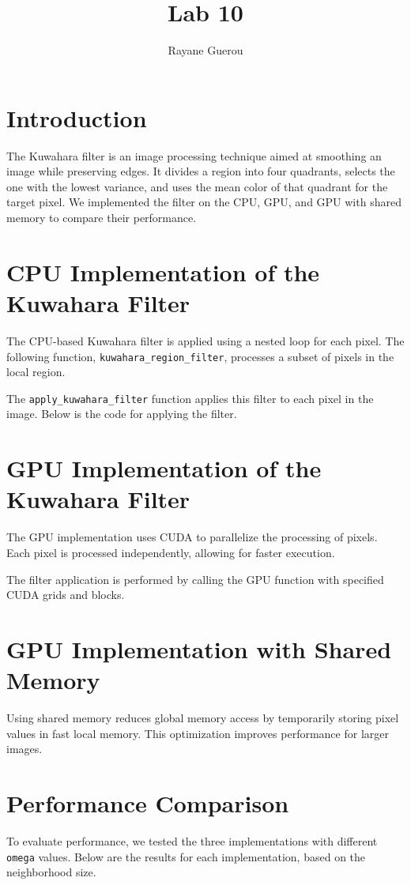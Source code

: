\documentclass{article}
\title{Lab 10}
\author{Rayane Guerou}
\begin{document}
\maketitle

\section{Introduction}
The Kuwahara filter is an image processing technique aimed at smoothing an image while preserving edges. It divides a region into four quadrants, selects the one with the lowest variance, and uses the mean color of that quadrant for the target pixel. We implemented the filter on the CPU, GPU, and GPU with shared memory to compare their performance.

\section{CPU Implementation of the Kuwahara Filter}
The CPU-based Kuwahara filter is applied using a nested loop for each pixel. The following function, \texttt{kuwahara\_region\_filter}, processes a subset of pixels in the local region.


The \texttt{apply\_kuwahara\_filter} function applies this filter to each pixel in the image. Below is the code for applying the filter.

\section{GPU Implementation of the Kuwahara Filter}
The GPU implementation uses CUDA to parallelize the processing of pixels. Each pixel is processed independently, allowing for faster execution.

The filter application is performed by calling the GPU function with specified CUDA grids and blocks.

\section{GPU Implementation with Shared Memory}
Using shared memory reduces global memory access by temporarily storing pixel values in fast local memory. This optimization improves performance for larger images.

\section{Performance Comparison}
To evaluate performance, we tested the three implementations with different \texttt{omega} values. Below are the results for each implementation, based on the neighborhood size.
\end{document}
